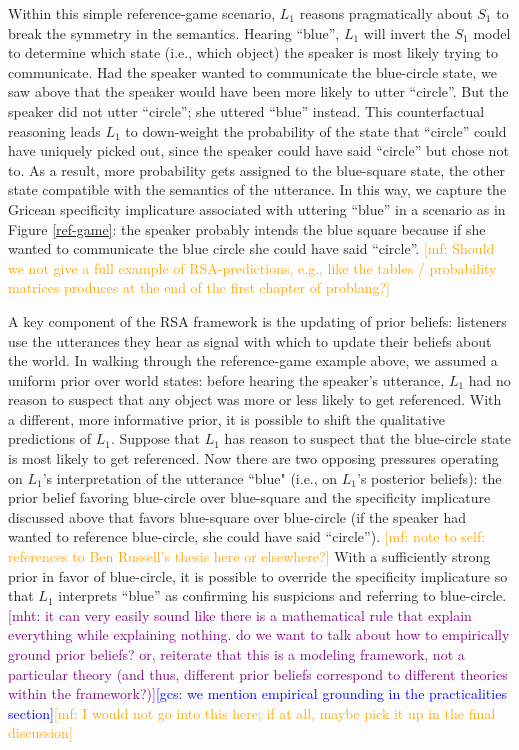 \documentclass{sp}
\newcommand{\gcs}[1]{\textcolor{blue}{[gcs: #1]}}
\newcommand{\mf}[1]{\textcolor{orange}{[mf: #1]}}
\newcommand{\mht}[1]{\textcolor{purple}{[mht: #1]}}
\begin{document}
Within this simple reference-game scenario, $L_1$ reasons pragmatically about $S_1$ to break the symmetry in the semantics. Hearing ``blue'', $L_1$ will invert the $S_1$ model to determine which state (i.e., which object) the speaker is most likely trying to communicate. Had the speaker wanted to communicate the blue-circle state, we saw above that the speaker would have been more likely to utter ``circle''. But the speaker did not utter ``circle''; she uttered ``blue'' instead. This counterfactual reasoning leads $L_1$ to down-weight the probability of the state that ``circle'' could have uniquely picked out, since the speaker could have said ``circle'' but chose not to. As a result, more probability gets assigned to the blue-square state, the other state compatible with the semantics of the utterance. In this way, we capture the Gricean specificity implicature associated with uttering ``blue'' in a scenario as in Figure \ref{ref-game}: the speaker probably intends the blue square because if she wanted to communicate the blue circle she could have said ``circle''.
\mf{Should we not give a full example of RSA-predictions, e.g., like the tables / probability matrices produces at the end of the first chapter of problang?}

A key component of the RSA framework is the updating of prior beliefs: listeners use the utterances they hear as signal with which to update their beliefs about the world. In walking through the reference-game example above, we assumed a uniform prior over world states: before hearing the speaker's utterance, $L_1$ had no reason to suspect that any object was more or less likely to get referenced. With a different, more informative prior, it is possible to shift the qualitative predictions of $L_1$. Suppose that $L_1$ has reason to suspect that the blue-circle state is most likely to get referenced. Now there are two opposing pressures operating on $L_1$'s interpretation of the utterance ``blue" (i.e., on $L_1$'s posterior beliefs): the prior belief favoring blue-circle over blue-square and the specificity implicature discussed above that favors blue-square over blue-circle (if the speaker had wanted to reference blue-circle, she could have said ``circle''). \mf{note to self: references to Ben Russell's thesis here or elsewhere?} With a sufficiently strong prior in favor of blue-circle, it is possible to override the specificity implicature so that $L_1$ interprets ``blue'' as confirming his suspicions and referring to blue-circle.
\mht{it can very easily sound like there is a mathematical rule that explain everything while explaining nothing. do we want to talk about how to empirically ground prior beliefs? or, reiterate that this is a modeling framework, not a particular theory (and thus, different prior beliefs correspond to different theories within the framework?)}\gcs{we mention empirical grounding in the practicalities section}\mf{I would not go into this here; if at all, maybe pick it up in the final discussion}
\end{document}
